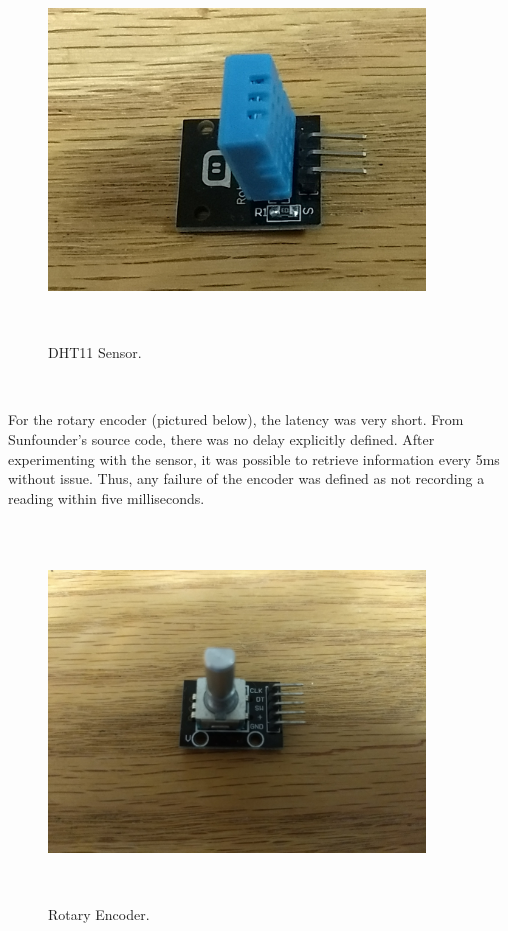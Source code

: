 \documentclass[letterpaper, 12pt]{article}
\begin{document}
~\newline 
\begin{figure}[H]
	\centering
	\includegraphics[width=10cm,height=10cm,keepaspectratio]{humitemp.jpg}
	\caption[Sensor1]{DHT11 Sensor.}
	\label{fig:htsensor}
\end{figure}
~\newline

\indent For the rotary encoder (pictured below), the latency was very short.  From Sunfounder's source code, there was no delay explicitly defined.  After experimenting with the sensor, it was possible to retrieve information every 5ms without issue.  Thus, any failure of the encoder was defined as not recording a reading within five milliseconds.
~\newline 
\begin{figure}[H]
	\centering
	\includegraphics[width=10cm,height=10cm,keepaspectratio]{encoder.jpg}
	\caption[Sensor2]{Rotary Encoder.}
	\label{fig:encoder}
\end{figure}
\end{document}
